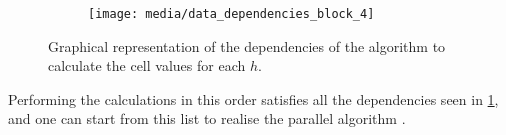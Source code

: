 \begin{figure}[htbp]
    \centering
    \begin{subfigure}[t]{0.8\textwidth}
        \centering
        \texttt{[image: media/data\_dependencies\_block\_4]}
    \end{subfigure}

    \caption{Graphical representation of the dependencies of the algorithm to calculate the cell values for each \(h\).}
    \label{fig:data-dependency-external-loop-parallel}
\end{figure}

Performing the calculations in this order satisfies all the dependencies seen in \cref{fig:data-dependency-external-loop-parallel}, and one can start from this list to realise the parallel algorithm \cite{rucci}.

